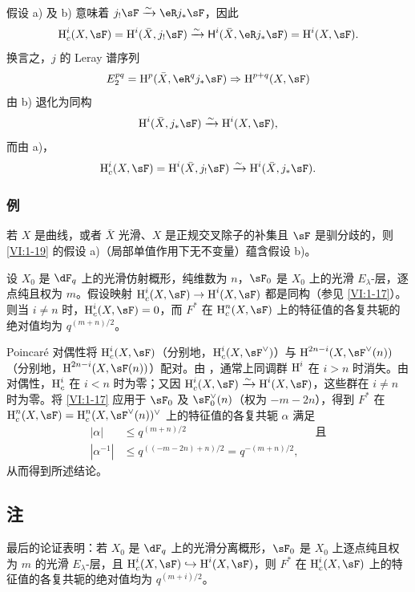 假设 a) 及 b) 意味着 $j_! \sF \iso \eR j_\ast \sF$，因此
\[
  \h_c^i(X,\sF) = \h^i(\bar X,j_!\sF) \iso \hh^i(\bar X,\eR j_\ast \sF) = \h^i(X,\sF) \text{.}
\]
换言之，$j$ 的 Leray 谱序列
\[
  E_2^{pq} = \h^p(\bar X,\eR^q j_\ast \sF) \Rightarrow \h^{p+q}(X,\sF)
\]
由 b) 退化为同构
\[
  \h^i(\bar X,j_\ast\sF) \iso \h^i(X,\sF) \text{,}
\]
而由 a)，
\[
  \h_c^i(X,\sF) = \h^i(\bar X,j_!\sF) \iso \h^i(\bar X,j_\ast\sF) \text{.}
\]

\subsubsection{例}\label{VI:1-19-1}

若 $X$ 是曲线，或者 $\bar X$ 光滑、$X$ 是正规交叉除子的补集且 $\sF$ 是驯分歧的，则 \ref{VI:1-19} 的假设 a)（局部单值作用下无不变量）蕴含假设 b)。

\begin{proposition_}\label{VI:1-20}
设 $X_0$ 是 $\dF_q$ 上的光滑仿射概形，纯维数为 $n$，$\sF_0$ 是 $X_0$ 上的光滑 $E_\lambda$-层，逐点纯且权为 $m$。假设映射 $\h_c^i(X,\sF) \to \h^i(X,\sF)$ 都是同构（参见 \ref{VI:1-17}）。则当 $i\ne n$ 时，$\h_c^i(X,\sF) = 0$，而 $F^\ast$ 在 $\h_c^n(X,\sF)$ 上的特征值的各复共轭的绝对值均为 $q^{(m+n)/2}$。
\end{proposition_}

Poincaré 对偶性将 $\h_c^i(X,\sF)$（分别地，$\h_c^i(X,\sF^\vee)$）与 $\h^{2n-i}(X,\sF^\vee(n))$（分别地，$\h^{2n-i}(X,\sF(n))$）配对。由 \cite[XIV 3.2]{sga4}，通常上同调群 $\operatorname{H}^i$ 在 $i>n$ 时消失。由对偶性，$\operatorname{H}_c^i$ 在 $i<n$ 时为零；又因 $\h_c^i(X,\sF) \iso \h^i(X,\sF)$，这些群在 $i\ne n$ 时为零。将 \ref{VI:1-17} 应用于 $\sF_0$ 及 $\sF_0^\vee(n)$（权为 $-m-2n$），得到 $F^\ast$ 在 $\h_c^n(X,\sF) = \h_c^n(X,\sF^\vee(n))^\vee$ 上的特征值的各复共轭 $\alpha$ 满足
\begin{align*}
  |\alpha| &\leqslant q^{(m+n)/2} && \text{且} \\
  |\alpha^{-1}| &\leqslant q^{((-m-2n)+n)/2} = q^{-(m+n)/2} \text{,}
\end{align*}
从而得到所述结论。

\subsection{注}\label{VI:1-21}

最后的论证表明：若 $X_0$ 是 $\dF_q$ 上的光滑分离概形，$\sF_0$ 是 $X_0$ 上逐点纯且权为 $m$ 的光滑 $E_\lambda$-层，且 $\h_c^i(X,\sF) \hookrightarrow \h^i(X,\sF)$，则 $F^\ast$ 在 $\h_c^i(X,\sF)$ 上的特征值的各复共轭的绝对值均为 $q^{(m+i)/2}$。

